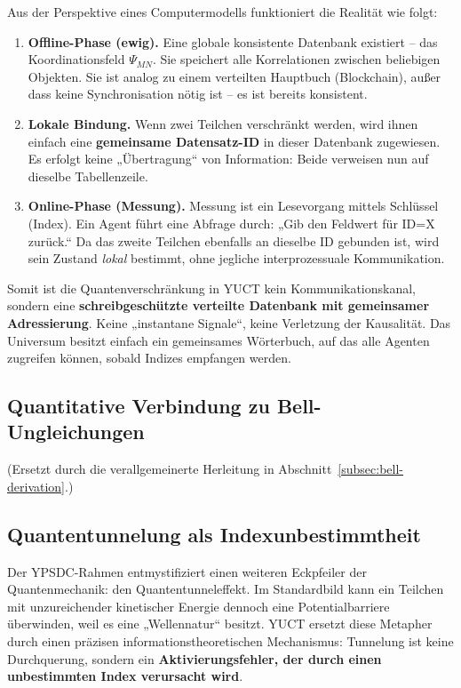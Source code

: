 \documentclass[12pt,a4paper]{article}
\theoremstyle{remark}
\begin{document}
	Aus der Perspektive eines Computermodells funktioniert die Realität wie folgt:
	
	\begin{enumerate}[leftmargin=*]
		\item \textbf{Offline-Phase (ewig).} Eine globale konsistente Datenbank existiert – das Koordinationsfeld \(\Psi_{MN}\). Sie speichert alle Korrelationen zwischen beliebigen Objekten. Sie ist analog zu einem verteilten Hauptbuch (Blockchain), außer dass keine Synchronisation nötig ist – es ist bereits konsistent.
		
		\item \textbf{Lokale Bindung.} Wenn zwei Teilchen verschränkt werden, wird ihnen einfach eine \textbf{gemeinsame Datensatz-ID} in dieser Datenbank zugewiesen. Es erfolgt keine „Übertragung“ von Information: Beide verweisen nun auf dieselbe Tabellenzeile.
		
		\item \textbf{Online-Phase (Messung).} Messung ist ein Lesevorgang mittels Schlüssel (Index). Ein Agent führt eine Abfrage durch: „Gib den Feldwert für ID=X zurück.“ Da das zweite Teilchen ebenfalls an dieselbe ID gebunden ist, wird sein Zustand \emph{lokal} bestimmt, ohne jegliche interprozessuale Kommunikation.
	\end{enumerate}
	
	Somit ist die Quantenverschränkung in YUCT kein Kommunikationskanal, sondern eine \textbf{schreibgeschützte verteilte Datenbank mit gemeinsamer Adressierung}. Keine „instantane Signale“, keine Verletzung der Kausalität. Das Universum besitzt einfach ein gemeinsames Wörterbuch, auf das alle Agenten zugreifen können, sobald Indizes empfangen werden.
	
	\subsection{Quantitative Verbindung zu Bell-Ungleichungen}
	\label{subsec:bell-inequalities}
	
	(Ersetzt durch die verallgemeinerte Herleitung in Abschnitt~\ref{subsec:bell-derivation}.)
	
	\subsection{Quantentunnelung als Indexunbestimmtheit}
	
	Der YPSDC-Rahmen entmystifiziert einen weiteren Eckpfeiler der Quantenmechanik: den Quantentunneleffekt. Im Standardbild kann ein Teilchen mit unzureichender kinetischer Energie dennoch eine Potentialbarriere überwinden, weil es eine „Wellennatur“ besitzt. YUCT ersetzt diese Metapher durch einen präzisen informationstheoretischen Mechanismus: Tunnelung ist keine Durchquerung, sondern ein \textbf{Aktivierungsfehler, der durch einen unbestimmten Index verursacht wird}.
	
\end{document}

